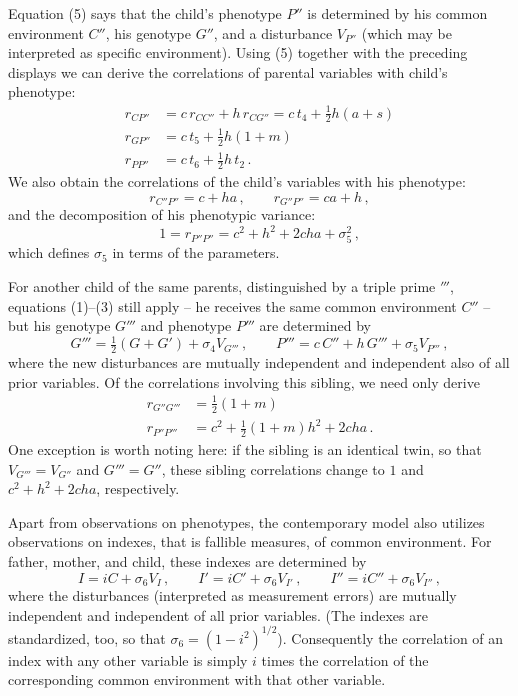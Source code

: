 ﻿\documentclass[12pt]{article}
\begin{document}
Equation (5) says that the child's phenotype $P''$ is determined by his common environment $C''$, his genotype $G''$, and a disturbance $V_{P''}$ (which may be interpreted as specific environment). Using (5) together with the preceding displays we can derive the correlations of parental variables with child's phenotype:
\begin{align*}
r_{CP''} &= c\,r_{CC''} + h\,r_{CG''} = c\,t_4 + \tfrac12 h(a+s) \\
r_{GP''} &= c\,t_5 + \tfrac12 h(1+m) \\
r_{PP''} &= c\,t_6 + \tfrac12 h\,t_2 \, .
\end{align*}
We also obtain the correlations of the child's variables with his phenotype:
\begin{equation*}
r_{C''P''} = c + ha \, , \qquad r_{G''P''} = ca + h \, ,
\end{equation*}
and the decomposition of his phenotypic variance:
\begin{equation*}
1 = r_{P''P''} = c^2 + h^2 + 2cha + \sigma_5^2 \, ,
\end{equation*}
which defines $\sigma_5$ in terms of the parameters.

For another child of the same parents, distinguished by a triple prime $'''$, equations (1)--(3) still apply -- he receives the same common environment $C''$ -- but his genotype $G'''$ and phenotype $P'''$ are determined by
\begin{equation*}
G''' = \tfrac12(G+G') + \sigma_4 V_{G'''} \, , \qquad P''' = c\,C'' + h\,G''' + \sigma_5 V_{P'''} \, ,
\end{equation*}
where the new disturbances are mutually independent and independent also of all prior variables. Of the correlations involving this sibling, we need only derive
\begin{align*}
r_{G''G'''} &= \tfrac12(1+m) \\
r_{P''P'''} &= c^2 + \tfrac12(1+m)h^2 + 2cha \, .
\end{align*}
One exception is worth noting here: if the sibling is an identical twin, so that $V_{G'''}=V_{G''}$ and $G'''=G''$, these sibling correlations change to $1$ and $c^2+h^2+2cha$, respectively.

Apart from observations on phenotypes, the contemporary model also utilizes observations on indexes, that is fallible measures, of common environment. For father, mother, and child, these indexes are determined by
\begin{equation*}
I = iC + \sigma_6 V_I \, , \qquad I' = iC' + \sigma_6 V_{I'} \, , \qquad I'' = iC'' + \sigma_6 V_{I''} \, ,
\end{equation*}
where the disturbances (interpreted as measurement errors) are mutually independent and independent of all prior variables. (The indexes are standardized, too, so that $\sigma_6 = (1-i^2)^{1/2}$). Consequently the correlation of an index with any other variable is simply $i$ times the correlation of the corresponding common environment with that other variable.
\end{document}
